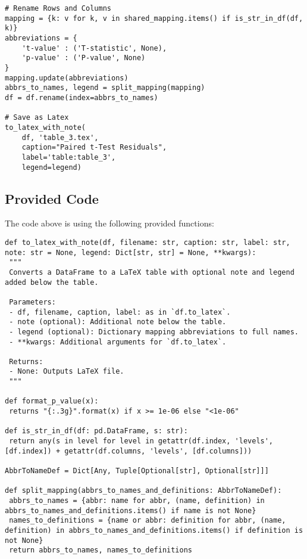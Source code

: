 \documentclass[11pt]{article}
\begin{document}
\begin{verbatim}
# Rename Rows and Columns
mapping = {k: v for k, v in shared_mapping.items() if is_str_in_df(df, k)}
abbreviations = { 
    't-value' : ('T-statistic', None),
    'p-value' : ('P-value', None)
}
mapping.update(abbreviations)
abbrs_to_names, legend = split_mapping(mapping)
df = df.rename(index=abbrs_to_names)

# Save as Latex
to_latex_with_note(
    df, 'table_3.tex',
    caption="Paired t-Test Residuals",
    label='table:table_3',
    legend=legend)

\end{verbatim}

\subsection{Provided Code}
The code above is using the following provided functions:

\begin{verbatim}
def to_latex_with_note(df, filename: str, caption: str, label: str, note: str = None, legend: Dict[str, str] = None, **kwargs):
 """
 Converts a DataFrame to a LaTeX table with optional note and legend added below the table.

 Parameters:
 - df, filename, caption, label: as in `df.to_latex`.
 - note (optional): Additional note below the table.
 - legend (optional): Dictionary mapping abbreviations to full names.
 - **kwargs: Additional arguments for `df.to_latex`.

 Returns:
 - None: Outputs LaTeX file.
 """

def format_p_value(x):
 returns "{:.3g}".format(x) if x >= 1e-06 else "<1e-06"

def is_str_in_df(df: pd.DataFrame, s: str):
 return any(s in level for level in getattr(df.index, 'levels', [df.index]) + getattr(df.columns, 'levels', [df.columns]))

AbbrToNameDef = Dict[Any, Tuple[Optional[str], Optional[str]]]

def split_mapping(abbrs_to_names_and_definitions: AbbrToNameDef):
 abbrs_to_names = {abbr: name for abbr, (name, definition) in abbrs_to_names_and_definitions.items() if name is not None}
 names_to_definitions = {name or abbr: definition for abbr, (name, definition) in abbrs_to_names_and_definitions.items() if definition is not None}
 return abbrs_to_names, names_to_definitions

\end{verbatim}
\end{document}
